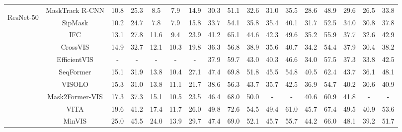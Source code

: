 \begin{table}[t!]
\begin{adjustbox}{max width = \textwidth}
\begin{tabular}{ccccccccccccccccc}
\multicolumn{1}{c|}{\multirow{17}{*}{\begin{turn}{90}{ResNet-50 }\end{turn}}} & \multicolumn{1}{c|}{MaskTrack R-CNN \citep{yang2019video}} & 10.8 & 25.3& 8.5 & 7.9& \multicolumn{1}{c|}{14.9} & 30.3 & 51.1& 32.6& 31.0  & \multicolumn{1}{c|}{35.5}& 28.6 & 48.9& 29.6& 26.5 & 33.8\\
\multicolumn{1}{c|}{} & \multicolumn{1}{c|}{SipMask \citep{cao2020sipmask}} & 10.2 & 24.7& 7.8 & 7.9& \multicolumn{1}{c|}{15.8} & 33.7 & 54.1& 35.8& 35.4  & \multicolumn{1}{c|}{40.1}& 31.7 & 52.5& 34.0& 30.8  & 37.8\\
\multicolumn{1}{c|}{} & \multicolumn{1}{c|}{IFC \citep{hwang2021video}} & 13.1 & 27.8& 11.6& 9.4& \multicolumn{1}{c|}{23.9}  & 41.2 & 65.1& 44.6& 42.3  & \multicolumn{1}{c|}{49.6}& 35.2 & 55.9& 37.7& 32.6  & 42.9\\
\multicolumn{1}{c|}{} & \multicolumn{1}{c|}{CrossVIS \citep{yang2021crossover}} & 14.9 & 32.7& 12.1& 10.3  & \multicolumn{1}{c|}{19.8} & 36.3 & 56.8& 38.9& 35.6  & \multicolumn{1}{c|}{40.7}& 34.2 & 54.4& 37.9& 30.4  & 38.2\\
\multicolumn{1}{c|}{} & \multicolumn{1}{c|}{EfficientVIS \citep{wu2022efficient}} & - & -& -& -  & \multicolumn{1}{c|}{-} & 37.9 & 59.7& 43.0& 40.3  & \multicolumn{1}{c|}{46.6}& 34.0 & 57.5& 37.3& 33.8  & 42.5\\
\multicolumn{1}{c|}{} & \multicolumn{1}{c|}{SeqFormer \citep{wu2022seqformer}} & 15.1 & 31.9& 13.8& 10.4  & \multicolumn{1}{c|}{27.1} & 47.4 & 69.8& 51.8& 45.5  & \multicolumn{1}{c|}{54.8}& 40.5 & 62.4& 43.7& 36.1  & 48.1\\
\multicolumn{1}{c|}{} & \multicolumn{1}{c|}{VISOLO \citep{han2022visolo}} & 15.3 & 31.0& 13.8& 11.1  & \multicolumn{1}{c|}{21.7}  & 38.6 & 56.3& 43.7& 35.7  & \multicolumn{1}{c|}{42.5}& 36.9 & 54.7& 40.2& 30.6  & 40.9\\
\multicolumn{1}{c|}{} & \multicolumn{1}{c|}{Mask2Former-VIS \citep{cheng2021mask2former}} & 17.3 & 37.3& 15.1& 10.5  & \multicolumn{1}{c|}{23.5} & 46.4 & 68.0& 50.0& -  & \multicolumn{1}{c|}{-}& 40.6 & 60.9& 41.8& -  & -\\
\multicolumn{1}{c|}{} & \multicolumn{1}{c|}{VITA \citep{heo2022vita}} & 19.6 & 41.2& 17.4& 11.7  & \multicolumn{1}{c|}{26.0} & 49.8 & 72.6& 54.5& 49.4  & \multicolumn{1}{c|}{61.0}& 45.7 & 67.4& 49.5& 40.9  & 53.6\\
\multicolumn{1}{c|}{} & \multicolumn{1}{c|}{MinVIS \citep{huang2022minvis}} & 25.0 & 45.5& 24.0& 13.9  & \multicolumn{1}{c|}{29.7} & 47.4 & 69.0& 52.1& 45.7  & \multicolumn{1}{c|}{55.7}& 44.2 & 66.0& 48.1& 39.2  & 51.7\\

\end{tabular}
\end{adjustbox}
\end{table}
